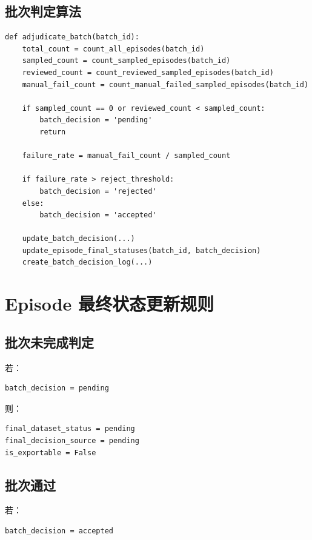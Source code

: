 \documentclass[UTF8,12pt,a4paper]{ctexart}
\begin{document}
\subsection{批次判定算法}

\begin{lstlisting}
def adjudicate_batch(batch_id):
    total_count = count_all_episodes(batch_id)
    sampled_count = count_sampled_episodes(batch_id)
    reviewed_count = count_reviewed_sampled_episodes(batch_id)
    manual_fail_count = count_manual_failed_sampled_episodes(batch_id)

    if sampled_count == 0 or reviewed_count < sampled_count:
        batch_decision = 'pending'
        return

    failure_rate = manual_fail_count / sampled_count

    if failure_rate > reject_threshold:
        batch_decision = 'rejected'
    else:
        batch_decision = 'accepted'

    update_batch_decision(...)
    update_episode_final_statuses(batch_id, batch_decision)
    create_batch_decision_log(...)
\end{lstlisting}

\section{Episode 最终状态更新规则}

\subsection{批次未完成判定}

若：

\begin{lstlisting}
batch_decision = pending
\end{lstlisting}

则：

\begin{lstlisting}
final_dataset_status = pending
final_decision_source = pending
is_exportable = False
\end{lstlisting}

\subsection{批次通过}

若：

\begin{lstlisting}
batch_decision = accepted
\end{lstlisting}
\end{document}
